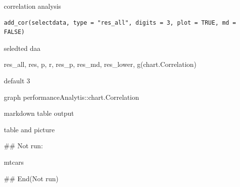\documentclass[a4paper]{book}
\begin{document}
%
\begin{Description}
correlation analysis
\end{Description}
%
\begin{Usage}
\begin{verbatim}
add_cor(selectdata, type = "res_all", digits = 3, plot = TRUE, md = FALSE)
\end{verbatim}
\end{Usage}
%
\begin{Arguments}
\begin{ldescription}
\item[\code{selectdata}] seledted daa

\item[\code{type}] res\_all, res, p, r, res\_p, res\_md, res\_lower, g(chart.Correlation)

\item[\code{digits}] default 3

\item[\code{plot}] graph performanceAnalytis::chart.Correlation

\item[\code{md}] markdown table output
\end{ldescription}
\end{Arguments}
%
\begin{Value}
table and picture
\end{Value}
%
\begin{Examples}
\begin{ExampleCode}

\#\# Not run: 

mtcars%

## End(Not run)
\end{ExampleCode}
\end{Examples}
\end{document}
